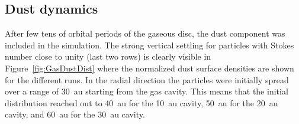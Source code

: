 \documentclass[fleqn,usenatbib]{mnras}
\begin{document}
    \subsection{Dust dynamics} \label{sec:results-dust}
        After few tens of orbital periods of the gaseous disc, the dust component was included in the simulation.
        The strong vertical settling for particles with Stokes number close to unity (last two rows) is clearly visible in Figure~\ref{fig:GasDustDist} where the normalized dust surface densities are shown for the different runs.
        In the radial direction the particles were initially spread over a range of \SI{30}{au} starting from the gas cavity. This means that the initial distribution reached out to \SI{40}{au} for the \SI{10}{au} cavity, \SI{50}{au} for the \SI{20}{au} cavity, and \SI{60}{au} for the \SI{30}{au} cavity.
\end{document}
